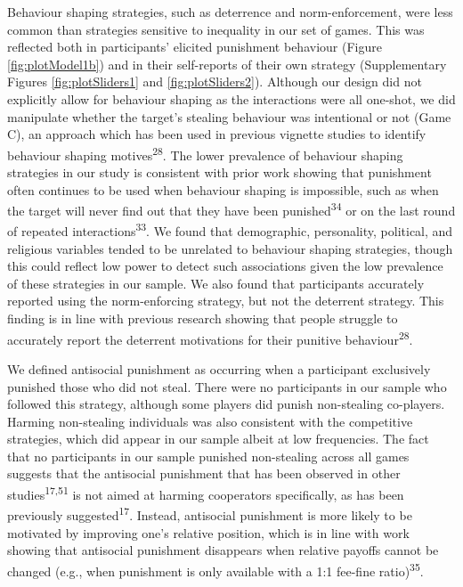 \documentclass[
  english,
  man, donotrepeattitle,floatsintext]{apa6}
\begin{document}
Behaviour shaping strategies, such as deterrence and norm-enforcement, were less
common than strategies sensitive to inequality in our set of games. This was
reflected both in participants' elicited punishment behaviour (Figure
\ref{fig:plotModel1b}) and in their self-reports of their own strategy
(Supplementary Figures \ref{fig:plotSliders1} and \ref{fig:plotSliders2}).
Although our design did not explicitly allow for behaviour shaping as the
interactions were all one-shot, we did manipulate whether the target's stealing
behaviour was intentional or not (Game C), an approach which has been used in
previous vignette studies to identify behaviour shaping motives\textsuperscript{28}.
The lower prevalence of behaviour shaping strategies in our study is consistent
with prior work showing that punishment often continues to be used when
behaviour shaping is impossible, such as when the target will never find out
that they have been punished\textsuperscript{34} or on the last round of repeated
interactions\textsuperscript{33}. We found that demographic, personality, political,
and religious variables tended to be unrelated to behaviour shaping strategies,
though this could reflect low power to detect such associations given the low
prevalence of these strategies in our sample. We also found that participants
accurately reported using the norm-enforcing strategy, but not the deterrent
strategy. This finding is in line with previous research showing that people
struggle to accurately report the deterrent motivations for their punitive
behaviour\textsuperscript{28}.

We defined antisocial punishment as occurring when a participant exclusively
punished those who did not steal. There were no participants in our sample who
followed this strategy, although some players did punish non-stealing
co-players. Harming non-stealing individuals was also consistent with the
competitive strategies, which did appear in our sample albeit at low frequencies.
The fact that no participants in our sample punished non-stealing across all
games suggests that the antisocial punishment that has been observed in other
studies\textsuperscript{17,51} is not aimed at harming cooperators
specifically, as has been previously suggested\textsuperscript{17}. Instead,
antisocial punishment is more likely to be motivated by improving one's
relative position, which is in line with work showing that antisocial punishment
disappears when relative payoffs cannot be changed (e.g., when punishment is
only available with a 1:1 fee-fine ratio)\textsuperscript{35}.
\end{document}
